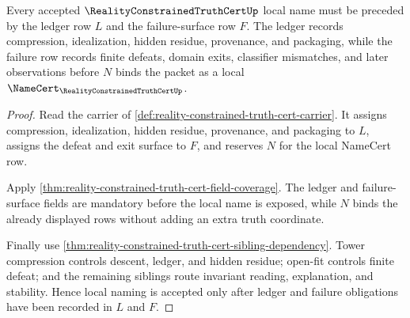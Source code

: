 \begin{theorem}
\label{thm:reality-constrained-truth-cert-ledger-failure-local-name-obligation}
Every accepted $\RealityConstrainedTruthCertUp$ local name must be preceded by the ledger row $L$ and the failure-surface row $F$. The ledger records compression, idealization, hidden residue, provenance, and packaging, while the failure row records finite defeats, domain exits, classifier mismatches, and later observations before $N$ binds the packet as a local $\NameCert_{\RealityConstrainedTruthCertUp}$.
\end{theorem}
\begin{proof}
Read the carrier of \autoref{def:reality-constrained-truth-cert-carrier}. It assigns compression, idealization, hidden residue, provenance, and packaging to $L$, assigns the defeat and exit surface to $F$, and reserves $N$ for the local NameCert row.

Apply \autoref{thm:reality-constrained-truth-cert-field-coverage}. The ledger and failure-surface fields are mandatory before the local name is exposed, while $N$ binds the already displayed rows without adding an extra truth coordinate.

Finally use \autoref{thm:reality-constrained-truth-cert-sibling-dependency}. Tower compression controls descent, ledger, and hidden residue; open-fit controls finite defeat; and the remaining siblings route invariant reading, explanation, and stability. Hence local naming is accepted only after ledger and failure obligations have been recorded in $L$ and $F$.
\end{proof}

